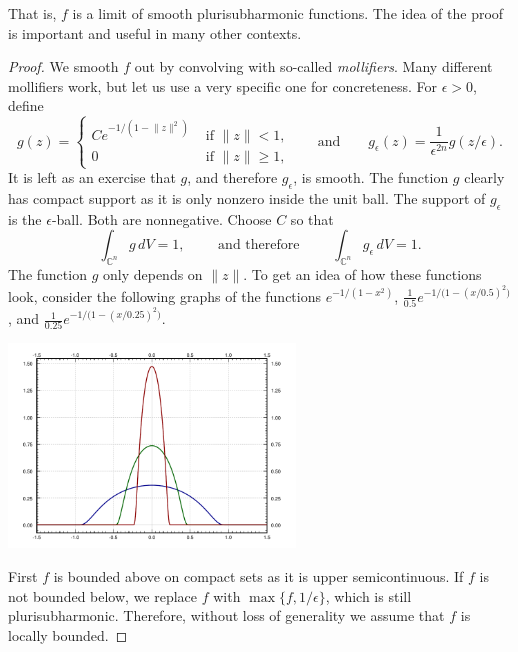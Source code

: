 \documentclass[12pt,openany]{book}
\newcommand{\snorm}[1]{\lVert {#1} \rVert}
\newcommand{\C}{{\mathbb{C}}}
\theoremstyle{plain}
\theoremstyle{remark}
\theoremstyle{definition}
\theoremstyle{exercise}
\theoremstyle{example}
\begin{document}
That is, $f$ is a limit of smooth plurisubharmonic functions.
The idea of the proof is important and useful in many other
contexts.

\begin{proof}
We smooth $f$ out by convolving with so-called
\emph{mollifiers}.  Many different mollifiers 
work, but let us use a very specific one for concreteness.
For $\epsilon > 0$, define 
\begin{equation*}
g(z) = 
\begin{cases}
C e^{-1/(1-\snorm{z}^2)} & \text{ if $\snorm{z} < 1$,}
\\
0 & \text{ if $\snorm{z} \geq 1$,}
\end{cases}
\qquad
\text{and}
\qquad
g_\epsilon(z) = \frac{1}{\epsilon^{2n}} g(z/\epsilon) .
\end{equation*}
It is left as an exercise that $g$, and therefore $g_\epsilon$, is smooth.
The function $g$ clearly has compact
support as it is only nonzero inside the unit ball.  The support of
$g_\epsilon$ is the $\epsilon$-ball.  Both are nonnegative.  Choose $C$ so that
\begin{equation*}
\int_{\C^n} g\, dV = 1 ,
\qquad \text{ and therefore } \qquad
\int_{\C^n} g_\epsilon\, dV = 1 .
\end{equation*}
The function $g$ only depends on $\snorm{z}$.  To get an idea of
how these functions look, consider the following graphs of the
functions $e^{-1/(1-x^2)}$,
$\frac{1}{0.5}e^{-1/\bigl(1-{(x/0.5)}^2\bigr)}$, and
$\frac{1}{0.25}e^{-1/\bigl(1-{(x/0.25)}^2\bigr)}$.

\begin{center}
\includegraphics[width=3.0in]{figures/graph-of-mollifier.pdf}
\end{center}

First $f$ is bounded above on compact sets as it is upper semicontinuous.
If $f$ is not bounded below, we replace $f$ with $\max \{ f , 1/\epsilon
\}$, which is still plurisubharmonic.  Therefore, without loss of generality
we assume that $f$ is locally bounded.


\end{proof}
\end{document}

